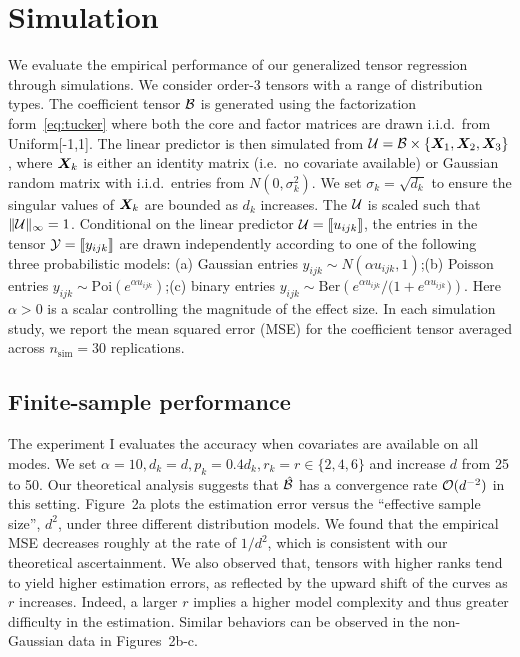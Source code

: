 \documentclass{article}
\theoremstyle{plain}
\theoremstyle{definition}
\begin{document}
\section{Simulation}\label{sec:simulation}
\vspace{-.2cm}
We evaluate the empirical performance of our generalized tensor regression through simulations. We consider order-3 tensors with a range of distribution types. The coefficient tensor $\mathcal{B}$ is generated using the factorization form~\eqref{eq:tucker} where both the core and factor matrices are drawn i.i.d.\ from Uniform[-1,1]. The linear predictor is then simulated from $\mathcal{U}=\mathcal{B}\times\{\bm X_1,\bm X_2,\bm X_3\}$, where $\bm X_k$ is either an identity matrix (i.e.\ no covariate available) or Gaussian random matrix with i.i.d.\ entries from $N(0,\sigma_k^2)$. We set $\sigma_k=\sqrt{d_k}$ to ensure the singular values of $\bm X_k$ are bounded as $d_k$ increases. The $\mathcal{U}$ is scaled such that $\lVert\mathcal{U}\rVert_\infty=1$. Conditional on the linear predictor $\mathcal{U}=\llbracket u_{ijk} \rrbracket$, the entries in the tensor $\mathcal{Y}=\llbracket y_{ijk} \rrbracket$ are drawn independently according to one of the following three probabilistic models: (a) Gaussian entries $y_{ijk}\sim N\left(\alpha u_{ijk}, 1\right)$;(b) Poisson entries $y_{ijk}\sim\text{Poi}\left( e^{\alpha u_{ijk}}\right)$;(c) binary entries $y_{ijk}\sim \text{Ber}\left( {e^{\alpha u_{ijk}} /( 1+e^{\alpha u_{ijk}}})\right)$. Here $\alpha>0$ is a scalar controlling the magnitude of the effect size. In each simulation study, we report the mean squared error (MSE) for the coefficient tensor averaged across $n_{\text{sim}}=30$ replications. 

\vspace{-.1cm}
\subsection{Finite-sample performance}

The experiment I evaluates the accuracy when covariates are available on all modes. We set $\alpha=10, d_k=d, p_k=0.4d_k, r_k=r\in\{2,4,6\}$ and increase $d$ from 25 to 50. Our theoretical analysis suggests that $\hat {\mathcal{B}}$ has a convergence rate $\mathcal{O}(d^{-2})$ in this setting. Figure~2a plots the estimation error versus the ``effective sample size'', $d^2$, under three different distribution models. We found that the empirical MSE decreases roughly at the rate of $1/d^2$, which is consistent with our theoretical ascertainment. We also observed that, tensors with higher ranks tend to yield higher estimation errors, as reflected by the upward shift of the curves as $r$ increases. Indeed, a larger $r$ implies a higher model complexity and thus greater difficulty in the estimation. Similar behaviors can be observed in the non-Gaussian data in Figures~2b-c. 
\end{document}
